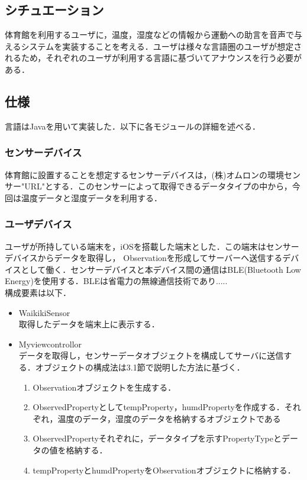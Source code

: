 \documentclass{kuisthesis}			%
\begin{document}
\subsection{シチュエーション}
体育館を利用するユーザに，温度，湿度などの情報から運動への助言を音声で与えるシステムを実装することを考える．ユーザは様々な言語圏のユーザが想定されるため，それぞれのユーザが利用する言語に基づいてアナウンスを行う必要がある．

\subsection{仕様}
言語はJavaを用いて実装した．以下に各モジュールの詳細を述べる．
\subsubsection{センサーデバイス}
体育館に設置することを想定するセンサーデバイスは，(株)オムロンの環境センサー"URL"とする．このセンサーによって取得できるデータタイプの中から，今回は温度データと湿度データを利用する．
\subsubsection{ユーザデバイス}
ユーザが所持している端末を，iOSを搭載した端末とした．この端末はセンサーデバイスからデータを取得し， Observationを形成してサーバーへ送信するデバイスとして働く．センサーデバイスと本デバイス間の通信はBLE(Bluetooth Low Energy)を使用する．BLEは省電力の無線通信技術であり..... \\
構成要素は以下．
\begin{itemize}
\item WaikikiSensor\\
取得したデータを端末上に表示する．
\item Myviewcontrollor\\
データを取得し，センサーデータオブジェクトを構成してサーバに送信する．オブジェクトの構成法は3.1節で説明した方法に基づく．
\begin{enumerate}
\item Observationオブジェクトを生成する．
\item ObservedPropertyとしてtempProperty，humdPropertyを作成する．それぞれ，温度のデータ，湿度のデータを格納するオブジェクトである
\item ObservedPropertyそれぞれに，データタイプを示すPropertyTypeとデータの値を格納する．
\item tempPropertyとhumdPropertyをObservationオブジェクトに格納する．
\end{enumerate}
\end{itemize}
\end{document}
